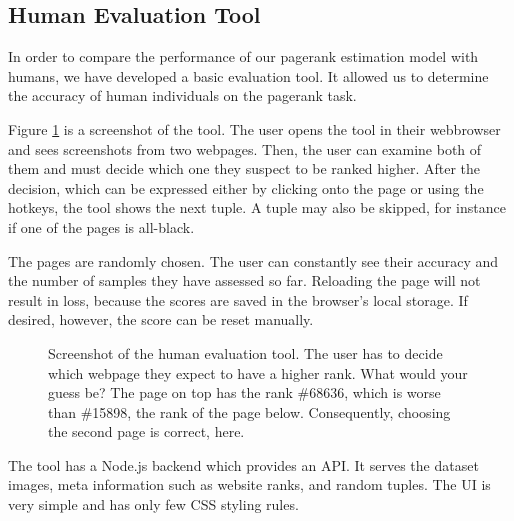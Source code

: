 \subsection{Human Evaluation Tool}

In order to compare the performance of our pagerank estimation model with humans, we have developed a basic evaluation tool. It allowed us to determine the accuracy of human individuals on the pagerank task.

Figure \ref{fig:humanevalscreenshot} is a screenshot of the tool. The user opens the tool in their webbrowser and sees screenshots from two webpages. Then, the user can examine both of them and must decide which one they suspect to be ranked higher. After the decision, which can be expressed either by clicking onto the page or using the hotkeys, the tool shows the next tuple. A tuple may also be skipped, for instance if one of the pages is all-black.

The pages are randomly chosen. The user can constantly see their accuracy and the number of samples they have assessed so far. Reloading the page will not result in loss, because the scores are saved in the browser's local storage. If desired, however, the score can be reset manually.

\begin{figure}\centering
    \caption[Screenshot of the human evaluation tool]{Screenshot of the human evaluation tool. The user has to decide which webpage they expect to have a higher rank. What would your guess be? The page on top has the rank \#68636, which is worse than \#15898, the rank of the page below. Consequently, choosing the second page is correct, here.}\label{fig:humanevalscreenshot}
\end{figure}

The tool has a Node.js backend which provides an API. It serves the dataset images, meta information such as website ranks, and random tuples. The UI is very simple and has only few CSS styling rules.
